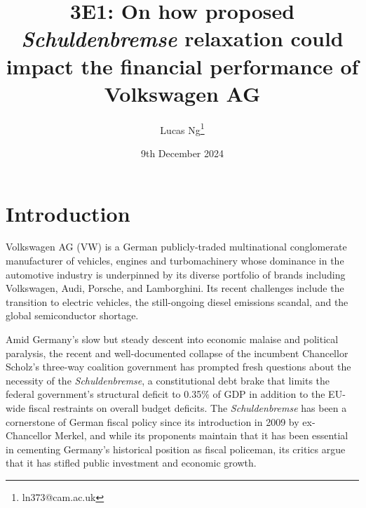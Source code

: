 \documentclass[10pt]{article}
\title{3E1: On how proposed \textit{Schuldenbremse} relaxation could impact the financial performance of Volkswagen AG}
\author{Lucas Ng\footnote{ln373@cam.ac.uk}}
\date{9th December 2024}
\begin{document}
\maketitle


\section{Introduction}
Volkswagen AG (VW) is a German publicly-traded multinational conglomerate manufacturer of vehicles, engines and turbomachinery whose dominance in the automotive industry is underpinned by its diverse portfolio of brands including Volkswagen, Audi, Porsche, and Lamborghini. Its recent challenges include the transition to electric vehicles, the still-ongoing diesel emissions scandal, and the global semiconductor shortage.

Amid Germany's slow but steady descent into economic malaise and political paralysis, the recent and well-documented collapse of the incumbent Chancellor Scholz's three-way coalition government has prompted fresh questions about the necessity of the \textit{Schuldenbremse}, a constitutional debt brake that limits the federal government's structural deficit to 0.35\% of GDP in addition to the EU-wide fiscal restraints on overall budget deficits.\@
The \textit{Schuldenbremse} has been a cornerstone of German fiscal policy since its introduction in 2009 by ex-Chancellor Merkel,
and while its proponents maintain that it has been essential in cementing Germany's historical position as fiscal policeman, its critics argue that it has stifled public investment and economic growth.
\end{document}
